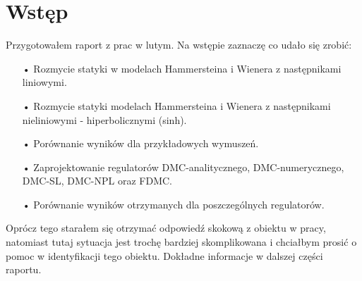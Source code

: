 \chapter{Wstęp}
Przygotowałem raport z prac w lutym. Na wstępie zaznaczę co udało się zrobić:

\begin{itemize}
\item[•] Rozmycie statyki w modelach Hammersteina i Wienera z następnikami liniowymi.
\item[•] Rozmycie statyki modelach Hammersteina i Wienera z następnikami nieliniowymi - hiperbolicznymi (sinh).
\item[•] Porównanie wyników dla przykładowych wymuszeń.
\item[•] Zaprojektowanie regulatorów DMC-analitycznego, DMC-numerycznego, DMC-SL, DMC-NPL oraz FDMC.
\item[•] Porównanie wyników otrzymanych dla poszczególnych regulatorów.
\end{itemize}

Oprócz tego starałem się otrzymać odpowiedź skokową z obiektu w pracy, natomiast tutaj sytuacja jest trochę bardziej skomplikowana i chciałbym prosić o pomoc w identyfikacji tego obiektu. Dokładne informacje w dalszej części raportu.